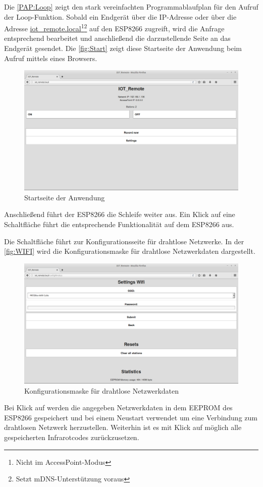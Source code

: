 Die \autoref{PAP:Loop} zeigt den stark vereinfachten Programmablaufplan für den Aufruf der Loop-Funktion.
Sobald ein Endgerät über die IP-Adresse oder über die Adresse \url{iot_remote.local}\footnote{Nicht im AccessPoint-Modus}\footnote{Setzt \acs{mDNS}-Unterstützung voraus} auf den ESP8266 zugreift, wird die Anfrage entsprechend bearbeitet und anschließend die darzustellende Seite an das Endgerät gesendet.
Die \autoref{fig:Start} zeigt diese Startseite der Anwendung beim Aufruf mittels eines Browsers.
\begin{figure}[!ht]
	\centering
	\includegraphics[scale=0.3]{Abbildungen/Start}
	\caption{Startseite der Anwendung}
	\label{fig:Start}
\end{figure}
Anschließend führt der ESP8266 die Schleife weiter aus.
Ein Klick auf eine Schaltfläche führt die entsprechende Funktionalität auf dem ESP8266 aus.

Die Schaltfläche  führt zur Konfigurationsseite für drahtlose Netzwerke.
In der \autoref{fig:WIFI} wird die Konfigurationsmaske für drahtlose Netzwerkdaten dargestellt.
\begin{figure}[!ht]
	\centering
	\includegraphics[scale=0.3]{Abbildungen/WIFI}
	\caption{Konfigurationsmaske für drahtlose Netzwerkdaten}
	\label{fig:WIFI}
\end{figure}
Bei Klick auf  werden die angegeben Netzwerkdaten in dem \acs{EEPROM} des ESP8266 gespeichert und bei einem Neustart verwendet um eine Verbindung zum drahtlosen Netzwerk herzustellen.
Weiterhin ist es mit Klick auf  möglich alle gespeicherten Infrarotcodes zurückzusetzen.

